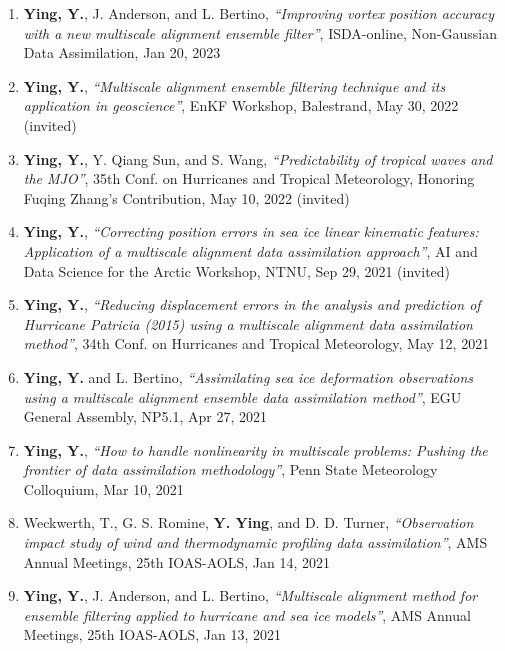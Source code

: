 \begin{enumerate}
\item \textbf{Ying, Y.}, J. Anderson, and L. Bertino,
\textit{``Improving vortex position accuracy with a new multiscale alignment ensemble filter''},
ISDA-online, Non-Gaussian Data Assimilation, Jan 20, 2023

\item \textbf{Ying, Y.},
\textit{``Multiscale alignment ensemble filtering technique and its application in geoscience''},
EnKF Workshop, Balestrand, May 30, 2022
(invited)

\item \textbf{Ying, Y.}, Y. Qiang Sun, and S. Wang,
\textit{``Predictability of tropical waves and the MJO''},
35th Conf. on Hurricanes and Tropical Meteorology, Honoring Fuqing Zhang’s Contribution, May 10, 2022
(invited)

\item \textbf{Ying, Y.},
\textit{``Correcting position errors in sea ice linear kinematic features: Application of a multiscale alignment data assimilation approach''},
AI and Data Science for the Arctic Workshop, NTNU, Sep 29, 2021
(invited)

\item \textbf{Ying, Y.},
\textit{``Reducing displacement errors in the analysis and prediction of Hurricane Patricia (2015) using a multiscale alignment data assimilation method''},
34th Conf. on Hurricanes and Tropical Meteorology, May 12, 2021

\item \textbf{Ying, Y.} and L. Bertino,
\textit{``Assimilating sea ice deformation observations using a multiscale alignment ensemble data assimilation method''},
EGU General Assembly, NP5.1, Apr 27, 2021

\item \textbf{Ying, Y.},
\textit{``How to handle nonlinearity in multiscale problems: Pushing the frontier of data assimilation methodology''},
Penn State Meteorology Colloquium, Mar 10, 2021

\item Weckwerth, T., G. S. Romine, \textbf{Y. Ying}, and D. D. Turner,
\textit{``Observation impact study of wind and thermodynamic profiling data assimilation''},
AMS Annual Meetings, 25th IOAS-AOLS, Jan 14, 2021

\item \textbf{Ying, Y.}, J. Anderson, and L. Bertino,
\textit{``Multiscale alignment method for ensemble filtering applied to hurricane and sea ice models''},
AMS Annual Meetings, 25th IOAS-AOLS, Jan 13, 2021


\end{enumerate}
